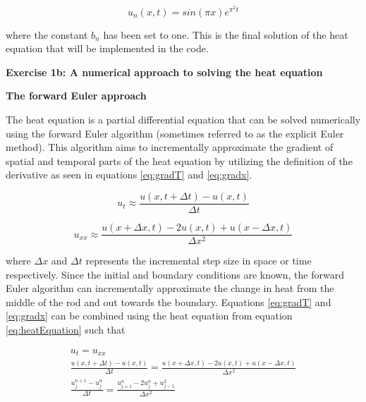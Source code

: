 \documentclass[12pt,a4paper]{article}
\begin{document}
\begin{equation}\label{eq:finalSol}
u_n(x,t) = sin(\pi x)e^{\pi^2 t}
\end{equation}

\noindent where the constant $b_n$ has been set to one. This is the final solution of the heat equation that will be implemented in the code.

\newpage

\begin{center}
\Large{\textbf{Exercise 1b: A numerical approach to solving the heat equation}}
\end{center}

\begin{center}
\large{\textbf{The forward Euler approach}}
\end{center}

\noindent The heat equation is a partial differential equation that can be solved numerically using the forward Euler algorithm (sometimes referred to as the explicit Euler method). This algorithm aims to incrementally approximate the gradient of spatial and temporal parts of the heat equation by utilizing the definition of the derivative as seen in equations \ref{eq:gradT} and \ref{eq:gradx}.

\begin{equation}\label{eq:gradT}
u_t \approx \frac{u(x, t+\Delta t) - u(x,t)}{\Delta t}
\end{equation}

\begin{equation}\label{eq:gradx}
u_{xx} \approx \frac{u(x + \Delta x, t) - 2u(x,t) + u(x-\Delta x,t)}{\Delta x^2}
\end{equation}

\noindent where $\Delta x$ and $\Delta t$ represents the incremental step size in space or time respectively. Since the initial and boundary conditions are known, the forward Euler algorithm can incrementally approximate the change in heat from the middle of the rod and out towards the boundary. Equations \ref{eq:gradT} and \ref{eq:gradx} can be combined using the heat equation from equation \ref{eq:heatEquation} such that

\begin{equation}\label{eq:forwardEuler1}
\begin{aligned}
u_t = u_{xx}
\\
\frac{u(x,t+\Delta t) - u(x,t)}{\Delta t} = \frac{u(x+\Delta x, t)-2u(x,t)+u(x-\Delta x,t)}{\Delta x^2}
\\
\frac{u_j^{n+1}-u_j^n}{\Delta t} = \frac{u_{j+1}^n - 2u_j^n + u_{j-1}^2}{\Delta x^2}
\end{aligned}
\end{equation}
\end{document}
